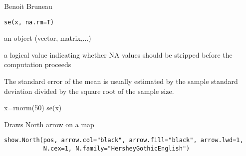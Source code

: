 \documentclass[a4paper]{book}
\begin{document}
%
\begin{Arguments}
\begin{ldescription}
\item[\code{data}] 


\end{ldescription}
\end{Arguments}
%
\begin{Author}\relax
Benoit Bruneau
\end{Author}
\newpage
{}
%
\begin{Usage}
\begin{verbatim}
se(x, na.rm=T)
\end{verbatim}
\end{Usage}
%
\begin{Arguments}
\begin{ldescription}
\item[\code{x}] an \R{} object (vector, matrix,...)

\item[\code{na.rm}] a logical value indicating whether NA values should be stripped before the computation proceeds

\end{ldescription}
\end{Arguments}
%
\begin{Details}\relax
The standard error of the mean is usually estimated by the sample standard deviation 
divided by the square root of the sample size.
\end{Details}
%
\begin{Examples}
\begin{ExampleCode}
x=rnorm(50)
se(x)
\end{ExampleCode}
\end{Examples}
\newpage
{}
%
\begin{Description}\relax
Draws North arrow on a map
\end{Description}
%
\begin{Usage}
\begin{verbatim}
show.North(pos, arrow.col="black", arrow.fill="black", arrow.lwd=1,
           N.cex=1, N.family="HersheyGothicEnglish")
\end{verbatim}
\end{Usage}
%
\end{document}
